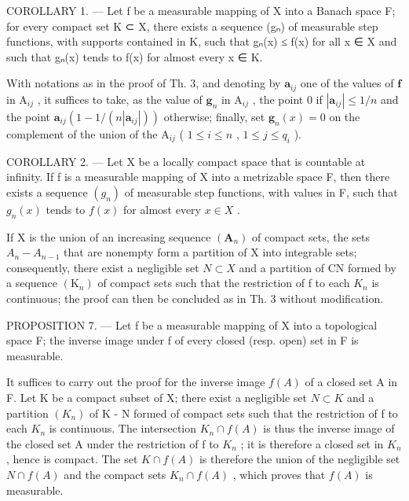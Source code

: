 COROLLARY 1. --- Let f be a measurable mapping of X into a Banach space F; for every compact set K ⊂ X, there exists a sequence (gₙ) of measurable step functions, with supports contained in K, such that \textbar gₙ(x)\textbar{} ≤ \textbar f(x)\textbar{} for all x ∈ X and such that gₙ(x) tends to f(x) for almost every x ∈ K.

With notations as in the proof of Th. 3, and denoting by \(\mathbf{a}_{ij}\) one of the values of \(\mathbf{f}\) in \(\mathrm{A}_{ij}\) , it suffices to take, as the value of \(\mathbf{g}_n\) in \(\mathrm{A}_{ij}\) , the point 0 if \(|\mathbf{a}_{ij}| \leqslant 1/n\) and the point \(\mathbf{a}_{ij}(1 - 1/(n|\mathbf{a}_{ij}|))\) otherwise; finally, set \(\mathbf{g}_n(x) = 0\) on the complement of the union of the \(\mathrm{A}_{ij}\) ( \(1 \leqslant i \leqslant n\) , \(1 \leqslant j \leqslant q_i\) ).

COROLLARY 2. --- Let X be a locally compact space that is countable at infinity. If f is a measurable mapping of X into a metrizable space F, then there exists a sequence \((g_{n})\) of measurable step functions, with values in F, such that \(g_{n}(x)\) tends to \(f(x)\) for almost every \(x \in X\) .

If X is the union of an increasing sequence \((\mathbf{A}_{n})\) of compact sets, the sets \(A_{n}-A_{n-1}\) that are nonempty form a partition of X into integrable sets; consequently, there exist a negligible set \(N\subset X\) and a partition of CN formed by a sequence \((\mathrm{K}_{n})\) of compact sets such that the restriction of f to each \(K_{n}\) is continuous; the proof can then be concluded as in Th. 3 without modification.

PROPOSITION 7. --- Let f be a measurable mapping of X into a topological space F; the inverse image under f of every closed (resp. open) set in F is measurable.

It suffices to carry out the proof for the inverse image \(f(A)\) of a closed set A in F. Let K be a compact subset of X; there exist a negligible set \(N \subset K\) and a partition \((K_n)\) of K - N formed of compact sets such that the restriction of f to each \(K_n\) is continuous. The intersection \(K_n \cap f(A)\) is thus the inverse image of the closed set A under the restriction of f to \(K_n\) ; it is therefore a closed set in \(K_n\) , hence is compact. The set \(K \cap f(A)\) is therefore the union of the negligible set \(N \cap f(A)\) and the compact sets \(K_n \cap f(A)\) , which proves that \(f(A)\) is measurable.

